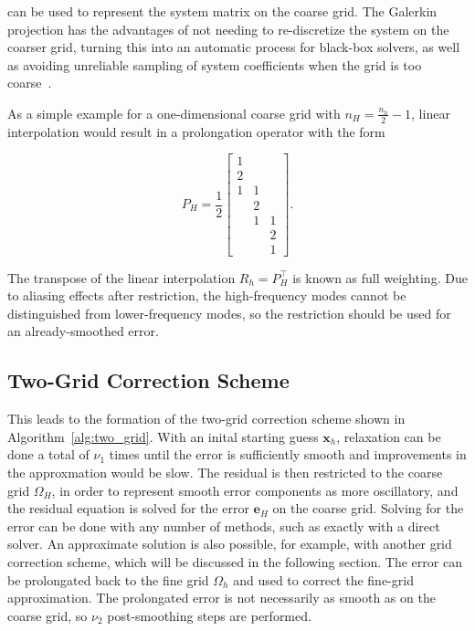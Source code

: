 can be used to represent the system matrix on the coarse grid. The Galerkin projection has the advantages of not needing to re-discretize the system on the coarser grid, turning this into an automatic process for black-box solvers, as well as avoiding unreliable sampling of system coefficients when the grid is too coarse~\cite{Wesseling2004}.

As a simple example for a one-dimensional coarse grid with $n_H = \frac{n_h}{2} - 1$, linear interpolation would result in a prolongation operator with the form

\begin{equation}
	P_H = \frac{1}{2}\begin{bmatrix}
		1 &   &   \\
		2 &   &   \\
		1 & 1 &   \\
		  & 2 &   \\
		  & 1 & 1 \\
		  &   & 2 \\
		  &   & 1
	\end{bmatrix}.
\end{equation}

The transpose of the linear interpolation $R_h = P_H^\top$ is known as full weighting. Due to aliasing effects after restriction, the high-frequency modes cannot be distinguished from lower-frequency modes, so the restriction should be used for an already-smoothed error.

\subsection{Two-Grid Correction Scheme}

This leads to the formation of the two-grid correction scheme shown in Algorithm~\ref{alg:two_grid}. With an inital starting guess $\mathbf{x}_h$, relaxation can be done a total of $\nu_1$ times until the error is sufficiently smooth and improvements in the approxmation would be slow. The residual is then restricted to the coarse grid $\Omega_H$, in order to represent smooth error components as more oscillatory, and the residual equation is solved for the error $\mathbf{e}_H$ on the coarse grid. Solving for the error can be done with any number of methods, such as exactly with a direct solver. An approximate solution is also possible, for example, with another grid correction scheme, which will be discussed in the following section. The error can be prolongated back to the fine grid $\Omega_h$ and used to correct the fine-grid approximation. The prolongated error is not necessarily as smooth as on the coarse grid, so $\nu_2$ post-smoothing steps are performed.

